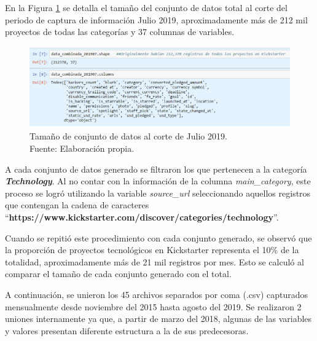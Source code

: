 En la Figura \ref{4:fig2} se detalla el tamaño del conjunto de datos total al corte del periodo de captura de información Julio 2019, aproximadamente más de 212 mil proyectos de todas las categorías y 37 columnas de variables.

\begin{figure}[h]
	\begin{center}
		\includegraphics[width=1\textwidth]{4/figures/dataset_201907.png}
		\caption[Tamaño de conjunto de datos al corte de Julio 2019]{Tamaño de conjunto de datos al corte de Julio 2019.\\
			Fuente: Elaboración propia.}
		\label{4:fig2}
	\end{center}
\end{figure}

A cada conjunto de datos generado se filtraron los que pertenecen a la categoría \textit{\textbf{Technology}}. Al no contar con la información de la columna \textit{main\_category}, este proceso se logró utilizando la variable \textit{source\_url} seleccionando aquellos registros que contengan la cadena de caracteres “\textbf{https://www.kickstarter.com/discover/categories/technology}”.

Cuando se repitió este procedimiento con cada conjunto generado, se observó que la proporción de proyectos tecnológicos en Kickstarter representa el 10\% de la totalidad, aproximadamente más de 21 mil registros por mes. Esto se calculó al comparar el tamaño de cada conjunto generado con el total.

A continuación, se unieron los 45 archivos separados por coma (.csv) capturados mensualmente desde noviembre del 2015 hasta agosto del 2019. Se realizaron 2 uniones internamente ya que, a partir de marzo del 2018, algunas de las variables y valores presentan diferente estructura a la de sus predecesoras.

